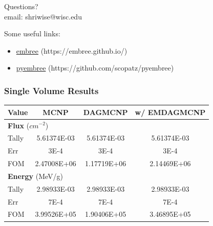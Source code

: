 \documentclass[12pt]{beamer}
\begin{document}
\begin{frame}

\begin{center}
\vfill
\huge {Questions?} \\
\vfill
\normalsize email: shriwise@wisc.edu
\vfill
\end{center}
\normalsize
Some useful links:
\begin{itemize}
\item \href{https://embree.github.io/}{{\color{blue}embree}} (https://embree.github.io/)
\item \href{https://github.com/scopatz/pyembree}{{\color{blue}pyembree}} (https://github.com/scopatz/pyembree)
\end{itemize}

\end{frame}


\begin{frame}
\frametitle{Single Volume Results}

\begin{table}[h]

  \begin{center}

    \begin{tabular}{lccc}
     \toprule
      Value & MCNP & DAGMCNP & w/ EMDAGMCNP \\
     \toprule
     \multicolumn{4}{l}{\textbf{Flux} ($cm^{-2}$)} \\
     \hline
     Tally & 5.61374E-03 & 5.61374E-03 & 5.61374E-03 \\
     Err & 3E-4 & 3E-4 & 3E-4  \\
     FOM & 2.47008E+06 & 1.17719E+06 & 2.14469E+06 \\
     \hline
     \multicolumn{4}{l}{\textbf{Energy} (MeV/g)} \\
     \hline
     Tally & 2.98933E-03 & 2.98933E-03 & 2.98933E-03 \\
     Err & 7E-4 & 7E-4 & 7E-4 \\
     FOM & 3.99526E+05 & 1.90406E+05 & 3.46895E+05 \\
     \bottomrule
     
    \end{tabular}


  \end{center}
\vspace{-0.4cm}
\end{table}

\end{frame}
\end{document}
